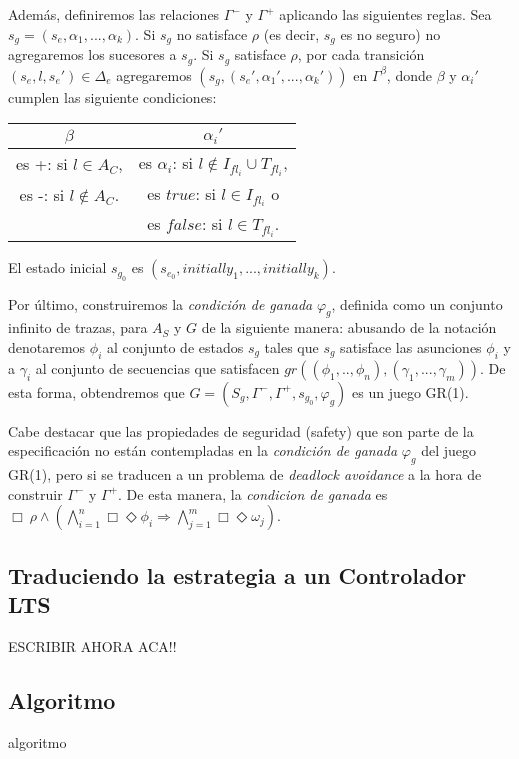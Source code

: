 Además, definiremos las relaciones $\Gamma^-$ y $\Gamma^+$ aplicando las siguientes reglas. Sea $s_g =
(s_e,\alpha_1,...,\alpha_k)$. Si $s_g$ no satisface $\rho$ (es decir, $s_g$ es no seguro) no agregaremos los sucesores a
$s_g$. Si $s_g$ satisface $\rho$, por cada transición $(s_e,l,s_e') \in \Delta_e$ agregaremos
$(s_g,(s_e',\alpha_1',...,\alpha_k'))$ en $\Gamma^{\beta}$, donde $\beta$ y $\alpha_i'$ cumplen las siguiente
condiciones:

\begin{center}
\begin{tabular}{ c | c}
$\beta$ & $\alpha_i'$ \\
\hline
es +: si $l \in A_C$, & es $\alpha_i$: si $l \notin I_{fl_i} \cup T_{fl_i}$, \\
es -: si $l \notin A_C$. & es $true$: si $l \in I_{fl_i}$ o \\
& es $false$: si $l \in T_{fl_i}$. \\
\end{tabular}
\end{center}

El estado inicial $s_{g_0}$ es $(s_{e_0},initially_1,...,initially_k)$.

Por último, construiremos la \emph{condición de ganada} $\varphi_g$, definida como un conjunto infinito de trazas, para
$A_S$ y $G$ de la siguiente manera: abusando de la notación denotaremos $\phi_i$ al conjunto de estados $s_g$ tales que
$s_g$ satisface las asunciones $\phi_i$ y a $\gamma_i$ al conjunto de secuencias que satisfacen
$gr((\phi_1,..,\phi_n),(\gamma_1,...,\gamma_m))$. De esta forma, obtendremos que $G = (S_g,\Gamma^-,\Gamma^+,s_{g_0},\varphi_g)$ es un
juego GR(1).

Cabe destacar que las propiedades de seguridad (safety) que son parte de la especificación no están contempladas en la
\emph{condición de ganada} $\varphi_g$ del juego GR(1), pero si se traducen a un problema de \emph{deadlock avoidance} a
la hora de construir $\Gamma^-$ y $\Gamma^+$. De esta manera, la \emph{condicion de ganada} es  $\Box\ \rho
\wedge(\bigwedge_{i=1}^n\Box\Diamond\phi_i \Rightarrow \bigwedge_{j=1}^m \Box\Diamond\omega_j)$.

\subsection{Traduciendo la estrategia a un Controlador LTS}

ESCRIBIR AHORA ACA!!

\subsection{Algoritmo}

algoritmo
